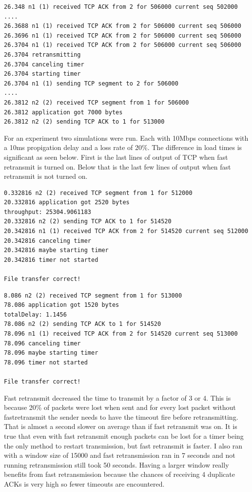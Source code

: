 \documentclass[fleqn,11pt]{article}
\begin{document}
\begin{lstlisting}
26.348 n1 (1) received TCP ACK from 2 for 506000 current seq 502000
....
26.3688 n1 (1) received TCP ACK from 2 for 506000 current seq 506000
26.3696 n1 (1) received TCP ACK from 2 for 506000 current seq 506000
26.3704 n1 (1) received TCP ACK from 2 for 506000 current seq 506000
26.3704 retransmitting
26.3704 canceling timer
26.3704 starting timer
26.3704 n1 (1) sending TCP segment to 2 for 506000
....
26.3812 n2 (2) received TCP segment from 1 for 506000
26.3812 application got 7000 bytes
26.3812 n2 (2) sending TCP ACK to 1 for 513000
\end{lstlisting}

For an experiment two simulations were run. Each with 10Mbps connections with a 10ms propigation delay and a loss rate of 20\%.
The difference in load times is significant as seen below.
First is the last lines of output of TCP when fast retransmit is turned on.
Below that is the last few lines of output when fast retransmit is not turned on.

\begin{lstlisting}
0.332816 n2 (2) received TCP segment from 1 for 512000
20.332816 application got 2520 bytes
throughput: 25304.9061183
20.332816 n2 (2) sending TCP ACK to 1 for 514520
20.342816 n1 (1) received TCP ACK from 2 for 514520 current seq 512000
20.342816 canceling timer
20.342816 maybe starting timer
20.342816 timer not started

File transfer correct!
\end{lstlisting}

\begin{lstlisting}
8.086 n2 (2) received TCP segment from 1 for 513000
78.086 application got 1520 bytes
totalDelay: 1.1456
78.086 n2 (2) sending TCP ACK to 1 for 514520
78.096 n1 (1) received TCP ACK from 2 for 514520 current seq 513000
78.096 canceling timer
78.096 maybe starting timer
78.096 timer not started

File transfer correct!
\end{lstlisting}

Fast retransmit decreased the time to transmit by a factor of 3 or 4.
This is because 20\% of packets were lost when sent and for every lost packet without fastretransmit the sender needs to have the timeout fire before retransmitting. 
That is almost a second slower on average than if fast retransmit was on. 
It is true that even with fast retransmit enough packets can be lost for a timer being the only method to restart transmission, but fast retransmit is faster.
I also ran with a window size of 15000 and fast retransmission ran in 7 seconds and not running retransmission still took 50 seconds.
Having a larger window really benefits from fast retransmission because the chances of receiving 4 duplicate ACKs is very high so fewer timeouts are encountered.
\end{document}
